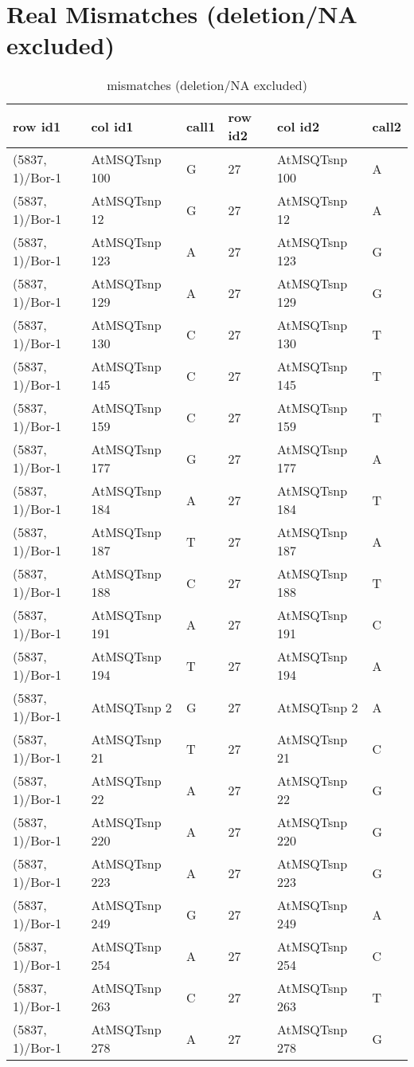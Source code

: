 \section{Real Mismatches (deletion/NA excluded)} \label{section_real_mismatch}
\begin{center}
\begin{longtable}{|l|l|l|l|l|l|}
\caption{mismatches (deletion/NA excluded)} \label{table_dm1}\\
\hline
row id1&col id1&call1&row id2&col id2&call2\\
\hline
(5837, 1)/Bor-1&AtMSQTsnp 100&G&27&AtMSQTsnp 100&A\\
(5837, 1)/Bor-1&AtMSQTsnp 12&G&27&AtMSQTsnp 12&A\\
(5837, 1)/Bor-1&AtMSQTsnp 123&A&27&AtMSQTsnp 123&G\\
(5837, 1)/Bor-1&AtMSQTsnp 129&A&27&AtMSQTsnp 129&G\\
(5837, 1)/Bor-1&AtMSQTsnp 130&C&27&AtMSQTsnp 130&T\\
(5837, 1)/Bor-1&AtMSQTsnp 145&C&27&AtMSQTsnp 145&T\\
(5837, 1)/Bor-1&AtMSQTsnp 159&C&27&AtMSQTsnp 159&T\\
(5837, 1)/Bor-1&AtMSQTsnp 177&G&27&AtMSQTsnp 177&A\\
(5837, 1)/Bor-1&AtMSQTsnp 184&A&27&AtMSQTsnp 184&T\\
(5837, 1)/Bor-1&AtMSQTsnp 187&T&27&AtMSQTsnp 187&A\\
(5837, 1)/Bor-1&AtMSQTsnp 188&C&27&AtMSQTsnp 188&T\\
(5837, 1)/Bor-1&AtMSQTsnp 191&A&27&AtMSQTsnp 191&C\\
(5837, 1)/Bor-1&AtMSQTsnp 194&T&27&AtMSQTsnp 194&A\\
(5837, 1)/Bor-1&AtMSQTsnp 2&G&27&AtMSQTsnp 2&A\\
(5837, 1)/Bor-1&AtMSQTsnp 21&T&27&AtMSQTsnp 21&C\\
(5837, 1)/Bor-1&AtMSQTsnp 22&A&27&AtMSQTsnp 22&G\\
(5837, 1)/Bor-1&AtMSQTsnp 220&A&27&AtMSQTsnp 220&G\\
(5837, 1)/Bor-1&AtMSQTsnp 223&A&27&AtMSQTsnp 223&G\\
(5837, 1)/Bor-1&AtMSQTsnp 249&G&27&AtMSQTsnp 249&A\\
(5837, 1)/Bor-1&AtMSQTsnp 254&A&27&AtMSQTsnp 254&C\\
(5837, 1)/Bor-1&AtMSQTsnp 263&C&27&AtMSQTsnp 263&T\\
(5837, 1)/Bor-1&AtMSQTsnp 278&A&27&AtMSQTsnp 278&G\\

\end{longtable}
\end{center}
